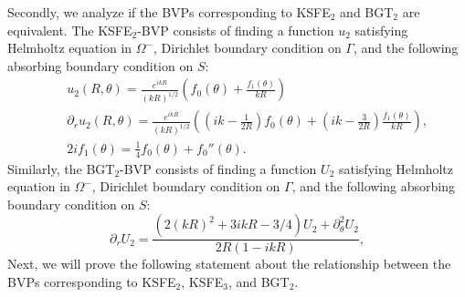 \documentclass[final,3p,times,12pt]{elsarticle}
\begin{document}
Secondly, we analyze if the BVPs corresponding to KSFE$_2$ and BGT$_2$ are equivalent. The KSFE$_2$-BVP consists of finding a function $u_2$ satisfying Helmholtz equation in $\Omega^{-}$, Dirichlet boundary condition on $\Gamma$, and the following absorbing boundary condition on $S$:
\begin{eqnarray}
&& u_2(R,\theta)= \frac{e^{ikR}}{(kR)^{1/2}}\left( f_0(\theta)+ \frac{f_1(\theta)}{kR}\right)\label{BVP2_3} \\
&&\partial_{r} u_2(R,\theta) = \frac{e^{ikR}}{(kR)^{1/2}} \left(  \left(ik - \frac{1}{2R} \right)f_{0}(\theta) + \left( ik - \frac{3}{2R} \right) \frac{f_{1}(\theta)}{kR}   \right), \label{BVP2_4} \\
&& 2 i f_1(\theta) = \frac{1}{4} f_0(\theta) + f_0''(\theta).\label{BVP2_5}
\end{eqnarray}
Similarly, the BGT$_2$-BVP consists of finding a function $U_2$ satisfying Helmholtz equation in $\Omega^{-}$, Dirichlet boundary condition on $\Gamma$, and the following absorbing boundary condition on $S$:
\begin{equation}
 \partial_{r}U_2 = \frac{( 2(kR)^2 + 3ikR - 3/4) U_2 + \partial^{2}_{\theta}U_2}{2R(1 - ikR)} 
,\label{BGT2ABC} 
\end{equation}
Next, we will prove the following statement about the relationship between the BVPs corresponding to KSFE$_2$, KSFE$_3$, and BGT$_2$. 
\end{document}
